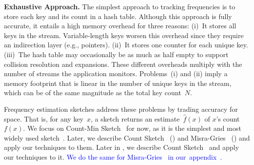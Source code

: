 \documentclass[sigconf]{acmart}
\begin{document}
\textbf{Exhaustive Approach.}
The simplest approach to tracking frequencies is to store each key and its
count in a hash table. Although this approach is fully accurate, it entails a
high memory overhead for three reasons: (i)~It stores all keys in the stream.
Variable-length keys worsen this overhead since they require an indirection
layer (e.g., pointers). (ii)~It stores one counter for each unique key.
(iii)~The hash table may occasionally be as much as half empty to support
collision resolution and expansions. These different overheads multiply with
the number of streams the application monitors. Problems~(i) and (ii) imply a
memory footprint that is linear in the number of unique keys in the stream,
which can be of the same magnitude as the total key count~$N$.

Frequency estimation sketches address these problems by trading accuracy for
space. That is, for any key~$x$, a sketch returns an estimate~$\hat{f}(x)$ of
$x$'s count~$f(x)$. We focus on Count-Min Sketch~\cite{CountMin} for now, as it
is the simplest and most widely used
sketch~\cite{ADSMassiveDatasetBook,SketchesTrafficManagementSurvey}. 
\ifappendix
Later, we describe Count Sketch~\cite{CountSketch}
() and
Misra-Gries~\cite{MisraGries}
() and apply our
techniques to them. 
\else
Later in , we
describe Count Sketch~\cite{CountSketch} and apply our techniques to it.
\textcolor{blue}{We do the same for Misra-Gries~\cite{MisraGries} in
our~appendix~\cite{SublimeArxiv}.}
\fi
\end{document}
